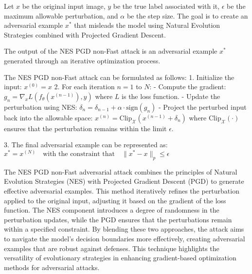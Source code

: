 Let $x$ be the original input image, $y$ be the true label associated with it, $\epsilon$ be the maximum allowable perturbation, and $\alpha$ be the step size. The goal is to create an adversarial example $x^*$ that misleads the model using Natural Evolution Strategies combined with Projected Gradient Descent.

The output of the NES PGD non-Fast attack is an adversarial example $x^*$ generated through an iterative optimization process.

The NES PGD non-Fast attack can be formulated as follows:
1. Initialize the input: 
   $x^{(0)} = x$
2. For each iteration $n = 1$ to $N$:
   - Compute the gradient:
   $g_n = \nabla_x L(f_\theta(x^{(n-1)}), y)$
   where $L$ is the loss function.
   - Update the perturbation using NES:
   $\delta_n = \delta_{n-1} + \alpha \cdot \text{sign}(g_n)$
   - Project the perturbed input back into the allowable space:
   $x^{(n)} = \text{Clip}_{\mathcal{X}}(x^{(n-1)} + \delta_n)$
   where $\text{Clip}_{\mathcal{X}}(\cdot)$ ensures that the perturbation remains within the limit $\epsilon$.

3. The final adversarial example can be represented as:
   $x^* = x^{(N)} \quad \text{with the constraint that} \quad \|x^* - x\|_p \leq \epsilon$

The NES PGD non-Fast adversarial attack combines the principles of Natural Evolution Strategies (NES) with Projected Gradient Descent (PGD) to generate effective adversarial examples. This method iteratively refines the perturbation applied to the original input, adjusting it based on the gradient of the loss function. The NES component introduces a degree of randomness in the perturbation updates, while the PGD ensures that the perturbations remain within a specified constraint. By blending these two approaches, the attack aims to navigate the model's decision boundaries more effectively, creating adversarial examples that are robust against defenses. This technique highlights the versatility of evolutionary strategies in enhancing gradient-based optimization methods for adversarial attacks.

